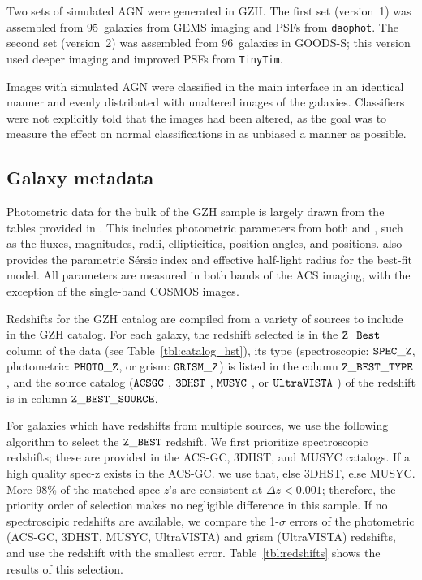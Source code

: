 \documentclass[twocolumn]{aastex6}
\begin{document}
Two sets of simulated AGN were generated in GZH. The first set (version~1) was assembled from 95~galaxies from GEMS imaging and PSFs from \texttt{daophot}. The second set (version~2) was assembled from 96~galaxies in GOODS-S; this version used deeper imaging and improved PSFs from \texttt{TinyTim}. 

Images with simulated AGN were classified in the main interface in an identical manner and evenly distributed with unaltered images of the galaxies. Classifiers were not explicitly told that the images had been altered, as the goal was to measure the effect on normal classifications in as unbiased a manner as possible. 

\subsection{Galaxy metadata}

Photometric data for the bulk of the GZH sample is largely drawn from the tables provided in \citet{gri12}. This includes photometric parameters from both \sextractor{} and \galfit, such as the fluxes, magnitudes, radii, ellipticities, position angles, and positions. \galfit{} also provides the parametric S\'{e}rsic index and effective half-light radius for the best-fit model. All parameters are measured in both bands of the ACS imaging, with the exception of the single-band COSMOS images.

Redshifts for the GZH catalog are compiled from a variety of sources to include in the GZH catalog. For each galaxy, the redshift selected is in the $\tt Z\_Best$ column of the data (see Table~\ref{tbl:catalog_hst}), its type (spectroscopic: $\tt SPEC\_Z$, photometric: $\tt PHOTO\_Z$, or grism: $ \tt GRISM\_Z$) is listed in the column $\tt Z\_BEST\_TYPE$, and the source catalog ($\tt ACSGC$ \citep{gri12}, $\tt 3DHST$ \citep{mom15}, $\tt MUSYC$ \citep{car10}, or $\tt UltraVISTA$ \citep{ilb13}) of the redshift is in column $\tt Z\_BEST\_SOURCE$.

For galaxies which have redshifts from multiple sources, we use the following algorithm to select the $\tt Z\_BEST$ redshift. We first prioritize spectroscopic redshifts; these are provided in the ACS-GC, 3DHST, and MUSYC catalogs. If a high quality spec-z exists in the ACS-GC. we use that, else 3DHST, else MUSYC. More 98\% of the matched spec-$z$'s are consistent at $\Delta z<0.001$; therefore, the priority order of selection makes no negligible difference in this sample. If no spectroscipic redshifts are available, we compare the 1-$\sigma$ errors of the photometric (ACS-GC, 3DHST, MUSYC, UltraVISTA) and grism (UltraVISTA) redshifts, and use the redshift with the smallest error. Table~\ref{tbl:redshifts} shows the results of this selection. 
 
\end{document}
